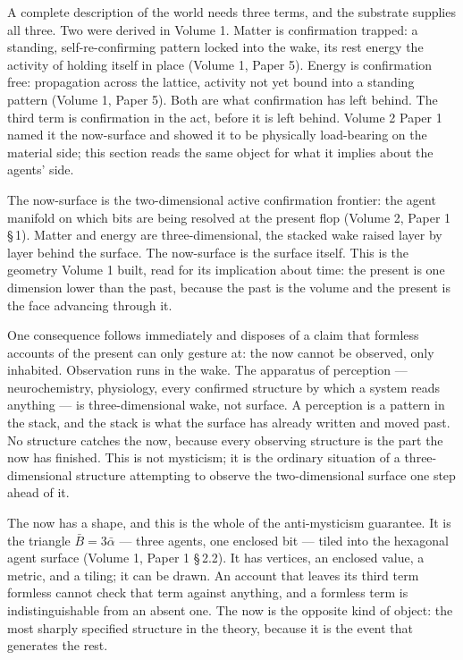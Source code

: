 \documentclass[11pt,oneside]{report}
\theoremstyle{definition}
\theoremstyle{remark}
\begin{document}
A complete description of the world needs three terms, and the substrate
supplies all three. Two were derived in Volume 1. Matter is confirmation
trapped: a standing, self-re-confirming pattern locked into the wake, its
rest energy the activity of holding itself in place (Volume 1, Paper 5).
Energy is confirmation free: propagation across the lattice, activity not
yet bound into a standing pattern (Volume 1, Paper 5). Both are what
confirmation has left behind. The third term is confirmation in the act,
before it is left behind. Volume 2 Paper 1 named it the now-surface and
showed it to be physically load-bearing on the material side; this
section reads the same object for what it implies about the agents' side.

The now-surface is the two-dimensional active confirmation frontier: the
agent manifold on which bits are being resolved at the present flop
(Volume 2, Paper 1 \S\,1). Matter and energy are three-dimensional, the
stacked wake raised layer by layer behind the surface. The now-surface is
the surface itself. This is the geometry Volume 1 built, read for its
implication about time: the present is one dimension lower than the past,
because the past is the volume and the present is the face advancing
through it.

One consequence follows immediately and disposes of a claim that formless
accounts of the present can only gesture at: the now cannot be observed,
only inhabited. Observation runs in the wake. The apparatus of perception
--- neurochemistry, physiology, every confirmed structure by which a
system reads anything --- is three-dimensional wake, not surface. A
perception is a pattern in the stack, and the stack is what the surface
has already written and moved past. No structure catches the now, because
every observing structure is the part the now has finished. This is not
mysticism; it is the ordinary situation of a three-dimensional structure
attempting to observe the two-dimensional surface one step ahead of it.

The now has a shape, and this is the whole of the anti-mysticism
guarantee. It is the triangle \ensuremath{\bar{B} = 3\bar{\alpha}} ---
three agents, one enclosed bit --- tiled into the hexagonal agent surface
(Volume 1, Paper 1 \S\,2.2). It has vertices, an enclosed value, a
metric, and a tiling; it can be drawn. An account that leaves its third
term formless cannot check that term against anything, and a formless
term is indistinguishable from an absent one. The now is the opposite
kind of object: the most sharply specified structure in the theory,
because it is the event that generates the rest.
\end{document}
